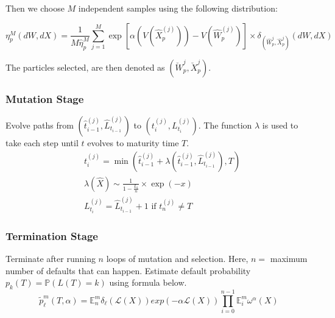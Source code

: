 Then we choose $M$ independent samples using the following distribution:

\begin{equation}
	\eta_{p}^{M} (dW,dX) = \frac{1}{M \hat{\eta}_{p}^{M}} \sum_{j=1}^{M} 
	\exp \left[ \alpha \left( V(\hat{X}_{p}^{(j)}) \right) - V(\hat{W}^{(j)}_{p}) 
	\right] \times \delta_{(\hat{W}_p^{j},\hat{X}_p^{j})} (dW,dX)
\end{equation}

The particles selected, are then denoted as $(\breve{W}_p^{j},\breve{X}_p^{j})$.

\subsubsection{Mutation Stage}
Evolve paths from $\left( \hat{t}_{i-1}^{(j)}, \hat{L}_{t_{i-1}}^{(j)}\right)$ to $\left(t^{(j)}_{i}, L_{t_{i}}^{(j)} \right)$.
The function $\lambda$ is used to take each step until $t$ evolves to maturity time $T$. 
			\begin{equation*}
				\begin{split}
					&t^{(j)}_{i}= \min\left(\hat{t}^{(j)}_{i-1} + \lambda\left(\hat{t}^{(j)}_{i-1},\hat{L}_{t_{i-1}}^{(j)}\right),T\right) \\
					& \lambda\left(\hat{X}\right) \sim \frac{1}{1-\frac{L_{t}}{n}} \times \exp(-x) \\
					&L_{t_{i}}^{(j)} = \hat{L}_{t_{i-1}}^{(j)} + 1 \text{ if } t^{(j)}_{n} 		\neq T					
				\end{split}	
		\end{equation*}

\subsubsection{Termination Stage}
Terminate after running $n$ loops of mutation and selection. Here, $n =$ maximum number of defaults that can happen.
 Estimate default probability $p_k(T) = \mathbb{P}\left( L\left( T \right) = k
		      \right)$ using formula below.
\begin{equation*}
	\tilde{p}^m_{\ell}(T,\alpha) = \mathbb{E}^{m}_{n}{\delta_{\ell}(\mathcal{L}(X))exp(-\alpha \mathcal{L}(X))}\prod_{i=0}^{n-1}\mathbb{E}_{i}^{m}\omega^{\alpha}(X)
\end{equation*}
